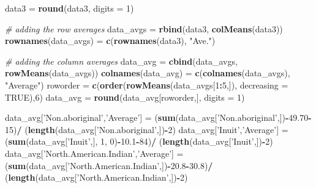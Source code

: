 \documentclass[9pt,letter]{article}
\newenvironment{Shaded}{\begin{snugshade}}{\end{snugshade}}
\newcommand{\KeywordTok}[1]{\textcolor[rgb]{0.13,0.29,0.53}{\textbf{#1}}}
\newcommand{\DataTypeTok}[1]{\textcolor[rgb]{0.13,0.29,0.53}{#1}}
\newcommand{\DecValTok}[1]{\textcolor[rgb]{0.00,0.00,0.81}{#1}}
\newcommand{\FloatTok}[1]{\textcolor[rgb]{0.00,0.00,0.81}{#1}}
\newcommand{\StringTok}[1]{\textcolor[rgb]{0.31,0.60,0.02}{#1}}
\newcommand{\CommentTok}[1]{\textcolor[rgb]{0.56,0.35,0.01}{\textit{#1}}}
\newcommand{\OtherTok}[1]{\textcolor[rgb]{0.56,0.35,0.01}{#1}}
\newcommand{\OperatorTok}[1]{\textcolor[rgb]{0.81,0.36,0.00}{\textbf{#1}}}
\newcommand{\NormalTok}[1]{#1}
\begin{document}
\begin{Shaded}
\begin{Highlighting}[]
\NormalTok{data3 =}\StringTok{ }\KeywordTok{round}\NormalTok{(data3, }\DataTypeTok{digits =} \DecValTok{1}\NormalTok{)}

\CommentTok{# adding the row averages}
\NormalTok{data_avgs =}\StringTok{ }\KeywordTok{rbind}\NormalTok{(data3, }\KeywordTok{colMeans}\NormalTok{(data3))}
\KeywordTok{rownames}\NormalTok{(data_avgs) =}\StringTok{ }\KeywordTok{c}\NormalTok{(}\KeywordTok{rownames}\NormalTok{(data3), }\StringTok{"Ave."}\NormalTok{)}

\CommentTok{# adding the column averages}
\NormalTok{data_avg =}\StringTok{ }\KeywordTok{cbind}\NormalTok{(data_avgs, }\KeywordTok{rowMeans}\NormalTok{(data_avgs))}
\KeywordTok{colnames}\NormalTok{(data_avg) =}\StringTok{ }\KeywordTok{c}\NormalTok{(}\KeywordTok{colnames}\NormalTok{(data_avgs), }\StringTok{"Average"}\NormalTok{)}
\NormalTok{roworder =}\StringTok{ }\KeywordTok{c}\NormalTok{(}\KeywordTok{order}\NormalTok{(}\KeywordTok{rowMeans}\NormalTok{(data_avgs[}\DecValTok{1}\OperatorTok{:}\DecValTok{5}\NormalTok{,]), }\DataTypeTok{decreasing =} \OtherTok{TRUE}\NormalTok{),}\DecValTok{6}\NormalTok{)}
\NormalTok{data_avg =}\StringTok{ }\KeywordTok{round}\NormalTok{(data_avg[roworder,], }\DataTypeTok{digits =} \DecValTok{1}\NormalTok{)}

\NormalTok{data_avg[}\StringTok{'Non.aboriginal'}\NormalTok{,}\StringTok{'Average'}\NormalTok{] =}\StringTok{ }\NormalTok{(}\KeywordTok{sum}\NormalTok{(data_avg[}\StringTok{'Non.aboriginal'}\NormalTok{,])}\OperatorTok{-}\FloatTok{49.70}\OperatorTok{-}\DecValTok{15}\NormalTok{)}\OperatorTok{/}
\StringTok{  }\NormalTok{(}\KeywordTok{length}\NormalTok{(data_avg[}\StringTok{'Non.aboriginal'}\NormalTok{,])}\OperatorTok{-}\DecValTok{2}\NormalTok{)}
\NormalTok{data_avg[}\StringTok{'Inuit'}\NormalTok{,}\StringTok{'Average'}\NormalTok{] =}\StringTok{ }\NormalTok{(}\KeywordTok{sum}\NormalTok{(data_avg[}\StringTok{'Inuit'}\NormalTok{,], }\DecValTok{1}\NormalTok{, }\DecValTok{0}\NormalTok{)}\OperatorTok{-}\FloatTok{10.1}\OperatorTok{-}\DecValTok{84}\NormalTok{)}\OperatorTok{/}
\StringTok{  }\NormalTok{(}\KeywordTok{length}\NormalTok{(data_avg[}\StringTok{'Inuit'}\NormalTok{,])}\OperatorTok{-}\DecValTok{2}\NormalTok{)}
\NormalTok{data_avg[}\StringTok{'North.American.Indian'}\NormalTok{,}\StringTok{'Average'}\NormalTok{] =}\StringTok{ }\NormalTok{(}\KeywordTok{sum}\NormalTok{(data_avg[}\StringTok{'North.American.Indian'}\NormalTok{,])}\OperatorTok{-}\FloatTok{20.8}\OperatorTok{-}\FloatTok{30.8}\NormalTok{)}\OperatorTok{/}
\StringTok{  }\NormalTok{(}\KeywordTok{length}\NormalTok{(data_avg[}\StringTok{'North.American.Indian'}\NormalTok{,])}\OperatorTok{-}\DecValTok{2}\NormalTok{)}


\end{Highlighting}
\end{Shaded}
\end{document}

